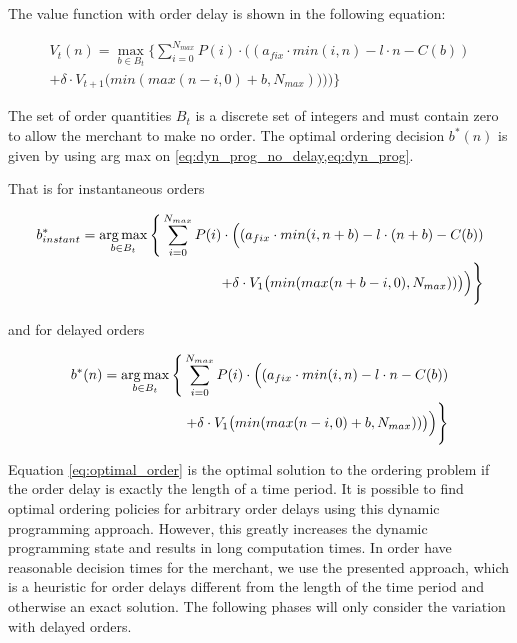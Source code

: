 The value function with order delay is shown in the following equation:

\begin{equation}
\begin{split}
V_t(n) = \max_{b \in B_t} \Bigg\{
	\sum_{i = 0}^{N_{max}} 
		P(i) \cdot \Big((
			a_{fix} \cdot min(i, n) %
			- l \cdot n %
			- C(b) %
		) \\
		+ \delta \cdot V_{t+1}\big(min(max(n - i, 0) + b, N_{max}))\big)
	\Big)\Bigg\}
\end{split}
\label{eq:dyn_prog}
\end{equation}

The set of order quantities $B_t$ is a discrete set of integers and must contain zero to allow the merchant to make no order.
The optimal ordering decision $b^*(n)$ is given by using arg max on \cref{eq:dyn_prog_no_delay,eq:dyn_prog}.

That is for instantaneous orders

\begin{equation}
\begin{split}
b^*_{instant} = \argmax_{b \in B_t} \Bigg\{
\sum_{i = 0}^{N_{max}}
P(i) \cdot \Big(
(a_{fix} \cdot min(i, n + b) %
- l \cdot (n + b) %
- C(b)) %
\\
+ \delta \cdot V_{1}\big(min(max(n + b - i, 0), N_{max}))\big)
\Big)\Bigg\}
\end{split}
\label{eq:optimal_order_instant}
\end{equation}

and for delayed orders

\begin{equation}
\begin{split}
b^*(n) = \argmax_{b \in B_t} \Bigg\{
\sum_{i = 0}^{N_{max}} 
P(i) \cdot \Big((
a_{fix} \cdot min(i, n) %
- l \cdot n %
- C(b) %
) \\
+ \delta \cdot V_{1}\big(min(max(n - i, 0) + b, N_{max}))\big)
\Big)\Bigg\}
\end{split}
\label{eq:optimal_order}
\end{equation}

Equation \cref{eq:optimal_order} is the optimal solution to the ordering problem if the order delay is exactly the length of a time period.
It is possible to find optimal ordering policies for arbitrary order delays using this dynamic programming approach.
However, this greatly increases the dynamic programming state and results in long computation times.
In order have reasonable decision times for the merchant, we use the presented approach, which is a heuristic for order delays different from the length of the time period and otherwise an exact solution.
The following phases will only consider the variation with delayed orders.

